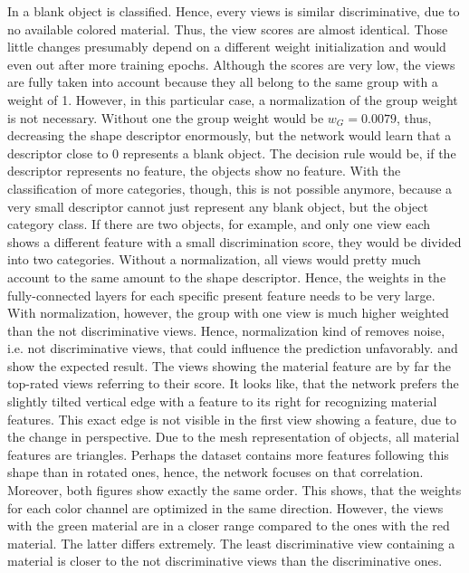 In  a blank object is classified.
Hence, every views is similar discriminative, due to no available colored material.
Thus, the view scores are almost identical.
Those little changes presumably depend on a different weight initialization and would even out after more training epochs.
Although the scores are very low, the views are fully taken into account because they all belong to the same group with a weight of 1.
However, in this particular case, a normalization of the group weight is not necessary.
Without one the group weight would be $w_G = 0.0079$, thus, decreasing the shape descriptor enormously, but the network would learn that a descriptor close to 0 represents a blank object.
The decision rule would be, if the descriptor represents no feature, the objects show no feature.
With the classification of more categories, though, this is not possible anymore, because a very small descriptor cannot just represent any blank object, but the object category class.
If there are two objects, for example, and only one view each shows a different feature with a small discrimination score, they would be divided into two categories.
Without a normalization, all views would pretty much account to the same amount to the shape descriptor.
Hence, the weights in the fully-connected layers for each specific present feature needs to be very large.
With normalization, however, the group with one view is much higher weighted than the not discriminative views.
Hence, normalization kind of removes noise, i.e. not discriminative views, that could influence the prediction unfavorably.
 and  show the expected result.
The views showing the material feature are by far the top-rated views referring to their score.
It looks like, that the network prefers the slightly tilted vertical edge with a feature to its right for recognizing material features.
This exact edge is not visible in the first view showing a feature, due to the change in perspective.
Due to the mesh representation of objects, all material features are triangles.
Perhaps the dataset contains more features following this shape than in rotated ones, hence, the network focuses on that correlation.
Moreover, both figures show exactly the same order.
This shows, that the weights for each color channel are optimized in the same direction.
However, the views with the green material are in a closer range compared to the ones with the red material.
The latter differs extremely.
The least discriminative view containing a material is closer to the not discriminative views than the discriminative ones.
